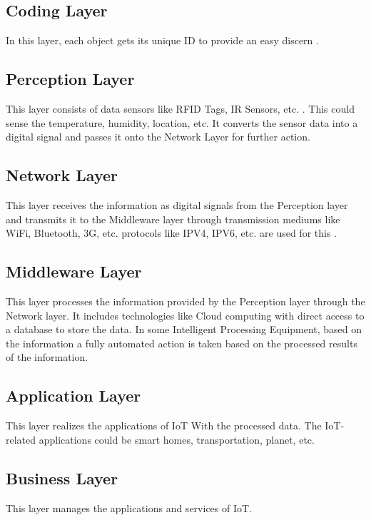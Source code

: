 \documentclass[twoside,twocolumn]{article}
\begin{document}
    \subsection{Coding Layer}
        In this layer, each object gets its unique ID to provide an easy discern \cite{ArchitectureIoT}.        
    \subsection{Perception Layer}
        This layer consists of data sensors like RFID Tags, IR Sensors, etc. .\cite{AppChallangesIoT} This could sense the temperature, humidity, location, etc. It converts the sensor data into a digital signal and passes it onto the Network Layer for further action.
        
    \subsection{Network Layer}
        This layer receives the information as digital signals from the Perception layer and transmits it to the Middleware layer through transmission mediums like WiFi, Bluetooth, 3G, etc. protocols like IPV4, IPV6, etc. are used for this \cite{TechnologyFrameworkIoT}.
        
    \subsection{Middleware Layer}
        This layer processes the information provided by the Perception layer through the Network layer. It includes technologies like Cloud computing with direct access to a database to store the data. In some Intelligent Processing Equipment, based on the information a fully automated action is taken based on the processed results of the information.
        
    \subsection{Application Layer}
        This layer realizes the applications of IoT With the processed data. The IoT-related applications could be smart homes, transportation, planet, etc.
        
    \subsection{Business Layer}
        This layer manages the applications and services of IoT.
        
\end{document}
